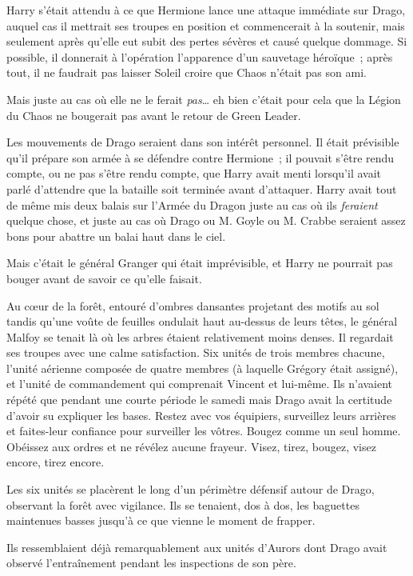 Harry s'était attendu à ce que Hermione lance une attaque immédiate sur Drago, auquel cas il mettrait ses troupes en position et commencerait à la soutenir, mais seulement après qu'elle eut subit des pertes sévères et causé quelque dommage. Si possible, il donnerait à l'opération l'apparence d'un sauvetage héroïque~; après tout, il ne faudrait pas laisser Soleil croire que Chaos n'était pas son ami.

Mais juste au cas où elle ne le ferait \emph{pas}… eh bien c'était pour cela que la Légion du Chaos ne bougerait pas avant le retour de Green Leader.

Les mouvements de Drago seraient dans son intérêt personnel. Il était prévisible qu'il prépare son armée à se défendre contre Hermione~; il pouvait s'être rendu compte, ou ne pas s'être rendu compte, que Harry avait menti lorsqu'il avait parlé d'attendre que la bataille soit terminée avant d'attaquer. Harry avait tout de même mis deux balais sur l'Armée du Dragon juste au cas où ils \emph{feraient} quelque chose, et juste au cas où Drago ou M. Goyle ou M. Crabbe seraient assez bons pour abattre un balai haut dans le ciel.

Mais c'était le général Granger qui était imprévisible, et Harry ne pourrait pas bouger avant de savoir ce qu'elle faisait.

\later

Au cœur de la forêt, entouré d'ombres dansantes projetant des motifs au sol tandis qu'une voûte de feuilles ondulait haut au-dessus de leurs têtes, le général Malfoy se tenait là où les arbres étaient relativement moins denses. Il regardait ses troupes avec une calme satisfaction. Six unités de trois membres chacune, l'unité aérienne composée de quatre membres (à laquelle Grégory était assigné), et l'unité de commandement qui comprenait Vincent et lui-même. Ils n'avaient répété que pendant une courte période le samedi mais Drago avait la certitude d'avoir su expliquer les bases. Restez avec vos équipiers, surveillez leurs arrières et faites-leur confiance pour surveiller les vôtres. Bougez comme un seul homme. Obéissez aux ordres et ne révélez aucune frayeur. Visez, tirez, bougez, visez encore, tirez encore.

Les six unités se placèrent le long d'un périmètre défensif autour de Drago, observant la forêt avec vigilance. Ils se tenaient, dos à dos, les baguettes maintenues basses jusqu'à ce que vienne le moment de frapper.

Ils ressemblaient déjà remarquablement aux unités d'Aurors dont Drago avait observé l'entraînement pendant les inspections de son père.

